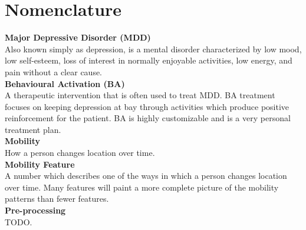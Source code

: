 
\chapter{Nomenclature}
\begin{acronym}[TDMA]
\end{acronym}

\textbf{Major Depressive Disorder (MDD)}\\
Also known simply as depression, is a mental disorder characterized by low mood, low self-esteem, loss of interest in normally enjoyable activities, low energy, and pain without a clear cause.\\

\textbf{Behavioural Activation (BA)}\\
A therapeutic intervention that is often used to treat MDD. BA treatment focuses on keeping depression at bay through activities which produce positive reinforcement for the patient. BA is highly customizable and is a very personal treatment plan.\\

\textbf{Mobility}\\
How a person changes location over time.\\

\textbf{Mobility Feature}\\
A number which describes one of the ways in which a person changes location over time. Many features will paint a more complete picture of the mobility patterns than fewer features.\\

\textbf{Pre-processing}\\
TODO.\\



